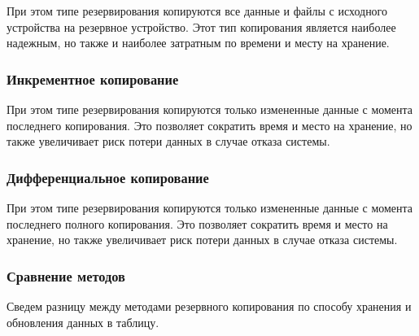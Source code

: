При этом типе резервирования копируются все данные и файлы с исходного устройства на резервное устройство. Этот тип копирования является наиболее надежным, но также и наиболее затратным по времени и месту на хранение.


\newpage
\subsubsection{Инкрементное копирование}

При этом типе резервирования копируются только измененные данные с момента последнего копирования. Это позволяет сократить время и место на хранение, но также увеличивает риск потери данных в случае отказа системы.


\newpage
\subsubsection{Дифференциальное копирование}

При этом типе резервирования копируются только измененные данные с момента последнего полного копирования. Это позволяет сократить время и место на хранение, но также увеличивает риск потери данных в случае отказа системы.


\newpage

\subsubsection{Сравнение методов}

Сведем разницу между методами резервного копирования по способу хранения и обновления данных в таблицу. 



